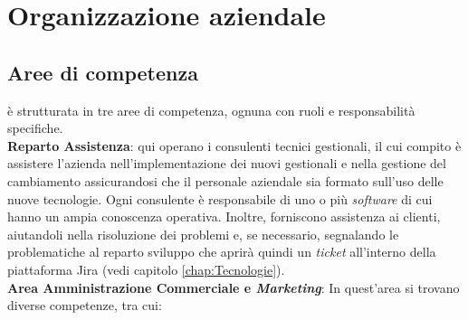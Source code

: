 \section{Organizzazione aziendale}
\subsection{Aree di competenza}
{\company} è strutturata in tre aree di competenza, ognuna con ruoli e responsabilità specifiche.\\
\textbf{Reparto Assistenza}: qui operano i consulenti tecnici gestionali, il cui compito è assistere l'azienda nell'implementazione dei nuovi gestionali 
e nella gestione del cambiamento assicurandosi che il personale aziendale sia formato sull'uso delle nuove tecnologie. Ogni consulente è responsabile di uno 
o più \textit{software} di cui hanno un ampia conoscenza operativa. Inoltre, forniscono assistenza ai clienti, aiutandoli 
nella risoluzione dei problemi e, se necessario, segnalando le problematiche al reparto sviluppo che aprirà quindi un 
\textit{ticket} all'interno della piattaforma Jira (vedi capitolo \ref{chap:Tecnologie}).\\
\textbf{Area Amministrazione Commerciale e \textit{Marketing}}: In quest'area si trovano diverse competenze, tra cui:
